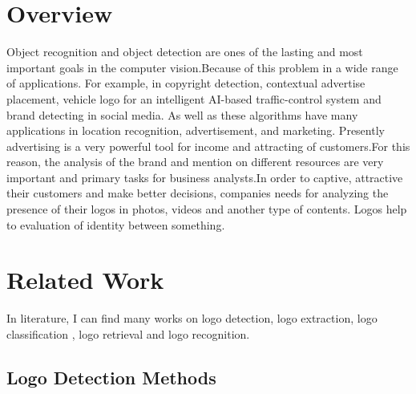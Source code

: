 \section{Overview} \label{sec:1.1}
\vspace{-0.5cm}
\noindent Object recognition and object detection are ones of the lasting and most important goals in the computer vision.Because of this problem in a wide range of applications. For example, in copyright detection, contextual advertise placement, vehicle logo for an intelligent AI-based traffic-control system and brand detecting in social media. As well as these algorithms have many applications in location recognition, advertisement, and marketing. Presently advertising is a very powerful tool for income and attracting of customers.For this reason, the analysis of the brand and mention on different resources are very important and primary tasks for business analysts.In order to captive, attractive their customers and make better decisions, companies needs for analyzing the presence of their logos in photos, videos and another type of contents. Logos help to evaluation of identity between something. 

\vspace{-0.5cm}

\noindent 


\vspace{-0.3cm}
\section{Related Work}\label{sec:1.2}
\vspace{-0.5cm}
\noindent In literature, I can find many works on logo detection, logo extraction, logo classification , logo retrieval and logo recognition.

\vspace{-0.3cm}


\subsection{Logo Detection Methods}\label{sec:1.2.1}
\vspace{-0.5cm}
